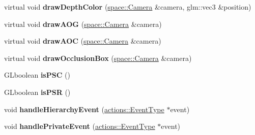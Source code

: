 \begin{DoxyCompactItemize}
\item 
\hypertarget{classfillwave_1_1models_1_1Entity_a583178291e394e22ba0e5f0c04229f30}{}virtual void {\bfseries draw\+Depth\+Color} (\hyperlink{classfillwave_1_1space_1_1Camera}{space\+::\+Camera} \&camera, glm\+::vec3 \&position)\label{classfillwave_1_1models_1_1Entity_a583178291e394e22ba0e5f0c04229f30}

\item 
\hypertarget{classfillwave_1_1models_1_1Entity_a29287c866cb76e14f64ae2b5e2aabf28}{}virtual void {\bfseries draw\+A\+O\+G} (\hyperlink{classfillwave_1_1space_1_1Camera}{space\+::\+Camera} \&camera)\label{classfillwave_1_1models_1_1Entity_a29287c866cb76e14f64ae2b5e2aabf28}

\item 
\hypertarget{classfillwave_1_1models_1_1Entity_ac350b688827706bd41598911d2658ddf}{}virtual void {\bfseries draw\+A\+O\+C} (\hyperlink{classfillwave_1_1space_1_1Camera}{space\+::\+Camera} \&camera)\label{classfillwave_1_1models_1_1Entity_ac350b688827706bd41598911d2658ddf}

\item 
\hypertarget{classfillwave_1_1models_1_1Entity_a226154ecde4890558d7153f8e71e00a3}{}virtual void {\bfseries draw\+Occlusion\+Box} (\hyperlink{classfillwave_1_1space_1_1Camera}{space\+::\+Camera} \&camera)\label{classfillwave_1_1models_1_1Entity_a226154ecde4890558d7153f8e71e00a3}

\item 
\hypertarget{classfillwave_1_1models_1_1Entity_af5de8adfe4da7787823c18a80d20d6a9}{}G\+Lboolean {\bfseries is\+P\+S\+C} ()\label{classfillwave_1_1models_1_1Entity_af5de8adfe4da7787823c18a80d20d6a9}

\item 
\hypertarget{classfillwave_1_1models_1_1Entity_ae54bed7959446c88541b0aa3e4956fe8}{}G\+Lboolean {\bfseries is\+P\+S\+R} ()\label{classfillwave_1_1models_1_1Entity_ae54bed7959446c88541b0aa3e4956fe8}

\item 
\hypertarget{classfillwave_1_1models_1_1Entity_a1b0402696711a20db58c65cfe6f5b23f}{}void {\bfseries handle\+Hierarchy\+Event} (\hyperlink{classfillwave_1_1actions_1_1EventType}{actions\+::\+Event\+Type} $\ast$event)\label{classfillwave_1_1models_1_1Entity_a1b0402696711a20db58c65cfe6f5b23f}

\item 
\hypertarget{classfillwave_1_1models_1_1Entity_ada0f6dd45517daf49c0a83b4b844b70c}{}void {\bfseries handle\+Private\+Event} (\hyperlink{classfillwave_1_1actions_1_1EventType}{actions\+::\+Event\+Type} $\ast$event)\label{classfillwave_1_1models_1_1Entity_ada0f6dd45517daf49c0a83b4b844b70c}


\end{DoxyCompactItemize}
